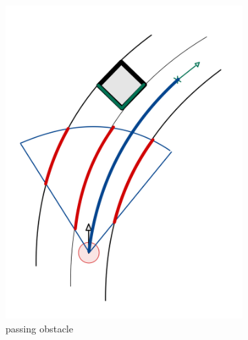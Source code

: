 \begin{figure}[H]
\begin{subfigure}{.3\linewidth}
		\includegraphics[width=\textwidth]{Pictures/passing obstacle}
		\caption{passing obstacle}
	\end{subfigure}
	\begin{subfigure}{.3\linewidth}

\end{subfigure}
\end{figure}
